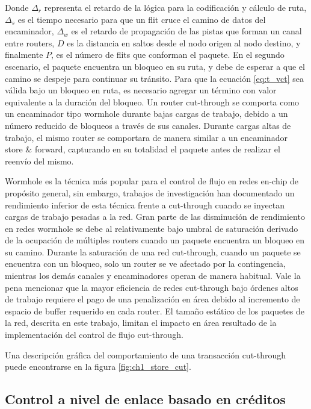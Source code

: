 Donde $\Delta_{r}$ representa el retardo de la lógica para la codificación y cálculo de ruta, $\Delta_{s}$ es el tiempo necesario para que un flit cruce el camino de datos del encaminador, $\Delta_{w}$ es el retardo de propagación de las pistas que forman un canal entre routers, $D$ es la distancia en saltos desde el nodo origen al nodo destino, y finalmente $P$, es el número de flits que conforman el paquete. En el segundo escenario, el paquete encuentra un bloqueo en su ruta, y debe de esperar a que el camino se despeje para continuar su tránsito. Para que la ecuación \ref{eq:t_vct} sea válida bajo un bloqueo en ruta, es necesario agregar un término con valor equivalente a la duración del bloqueo. Un router cut-through se comporta como un encaminador tipo wormhole durante bajas cargas de trabajo, debido a un número reducido de bloqueos a través de sus canales. Durante cargas altas de trabajo, el mismo router se comportara de manera similar a un encaminador store \& forward, capturando en su totalidad el paquete antes de realizar el reenvío del mismo.

Wormhole es la técnica más popular para el control de flujo en redes en-chip de propósito general, sin embargo, trabajos de investigación\cite{chapter2:Shin:1996:AIH:232665.232669, chapter2:Duato:2001:CRA:372836.372856} han documentado un rendimiento inferior de esta técnica frente a cut-through cuando se inyectan cargas de trabajo pesadas a la red. Gran parte de las disminución de rendimiento en redes wormhole se debe al relativamente bajo umbral de saturación derivado de la ocupación de múltiples routers cuando un paquete encuentra un bloqueo en su camino. Durante la saturación de una red cut-through, cuando un paquete se encuentra con un bloqueo, solo un router se ve afectado por la contingencia, mientras los demás canales y encaminadores operan de manera habitual. Vale la pena mencionar que la mayor eficiencia de redes cut-through bajo órdenes altos de trabajo requiere el pago de una penalización en área debido al incremento de espacio de buffer requerido en cada router. El tamaño estático de los paquetes de la red, descrita en este trabajo, limitan el impacto en área resultado de la implementación del control de flujo cut-through.

Una descripción gráfica del comportamiento de una transacción cut-through puede encontrarse en la figura \ref{fig:ch1_store_cut}.

\subsection{Control a nivel de enlace basado en créditos}
	\label{subsec:control_basado_creditos}

